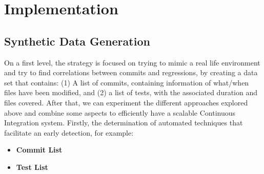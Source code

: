 
\chapter{Implementation}
\label{chapter:implementation}

\section{Synthetic Data Generation}

On a first level, the strategy is focused on trying to mimic a real life environment and try to find correlations between commits and regressions, by creating a  data set that contains: (1) A list of commits, containing information of what/when files have been modified, and (2) a list of tests, with the associated duration and files covered. After that, we can experiment the different approaches explored above and combine some aspects to efficiently have a scalable Continuous Integration system. Firstly, the determination of automated techniques that facilitate an early detection, for example:

\begin{multicols}{2}
	\begin{itemize}
		\item \textbf{Commit List}
	\end{itemize}
	
	\begin{itemize}
		\item \textbf{Test List}
	\end{itemize}
\end{multicols}

